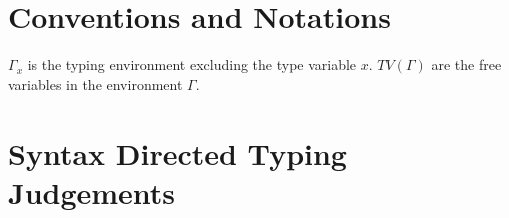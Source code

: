 \section{Conventions and Notations}
$\Gamma_{x}$ is the typing environment excluding the type variable $x$. $TV(\Gamma)$ are the free
variables in the environment $\Gamma$.

\section{Syntax Directed Typing Judgements}

